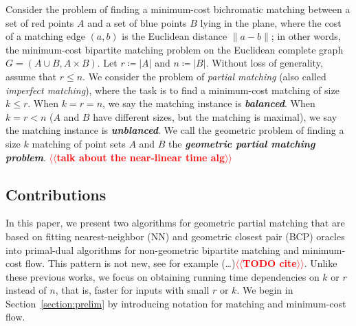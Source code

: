\documentclass[a4paper,UKenglish]{socg-lipics-v2018}
\makeatletter
\def\note#1{\textcolor{red}{{#1}}}
\def\polylog{\mathop{\mathrm{polylog}}}
\theoremstyle{plain}
\numberwithin{figure}{section}
\def\EMPH#1{\textbf{\emph{\boldmath #1}}}
\def\n@te#1{\textsf{\boldmath \textbf{$\langle\!\langle$#1$\rangle\!\rangle$}}\leavevmode}
\def\note#1{\textcolor{red}{\n@te{#1}}}
\makeatother
\begin{document}
Consider the problem of finding a minimum-cost bichromatic matching between
a set of red points $A$ and a set of blue points $B$ lying in the plane,
where the cost of a matching edge $(a, b)$ is the Euclidean distance
$\|a - b\|$;
in other words, the minimum-cost bipartite matching problem on the Euclidean
complete graph $G = (A \cup B, A \times B)$.
Let $r \coloneqq |A|$ and $n \coloneqq |B|$.
Without loss of generality, assume that $r \leq n$.
We consider the problem of \emph{partial matching} (also called \emph{imperfect matching}),
where the task is to find a minimum-cost matching of size $k \leq r$.
When $k = r = n$, we say the matching instance is \EMPH{balanced}.
When $k = r < n$ ($A$ and $B$ have different sizes, but the matching is
maximal), we say the matching instance is \EMPH{unblanced}.
We call the geometric problem of finding a size $k$ matching of point sets $A$
and $B$ the \EMPH{geometric partial matching problem}.
%
\note{talk about the near-linear time alg}%


\subsection{Contributions}

In this paper, we present two algorithms for geometric partial matching
that are based on fitting nearest-neighbor (NN) and geometric closest pair
(BCP) oracles into primal-dual algorithms for non-geometric bipartite matching
and minimum-cost flow.
This pattern is not new, see for example
(\dots)\note{TODO cite}.
Unlike these previous works, we focus on obtaining running time dependencies on
$k$ or $r$ instead of $n$, that is, faster for inputs with small $r$ or $k$.
We begin in Section~\ref{section:prelim} by introducing notation for matching
and minimum-cost flow.

\end{document}
